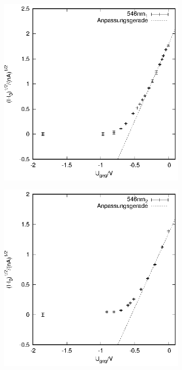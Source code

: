 \begin{figure}
  \begin{subfigure}[h]{0.49\textwidth}
    \centering
    \includegraphics{data/Messung_photoeffekt/546nm_1.eps}
  \end{subfigure}
  \begin{subfigure}[h]{0.49\textwidth}
    \centering
    \includegraphics{data/Messung_photoeffekt/546nm_2.eps}

\end{subfigure}
\end{figure}
